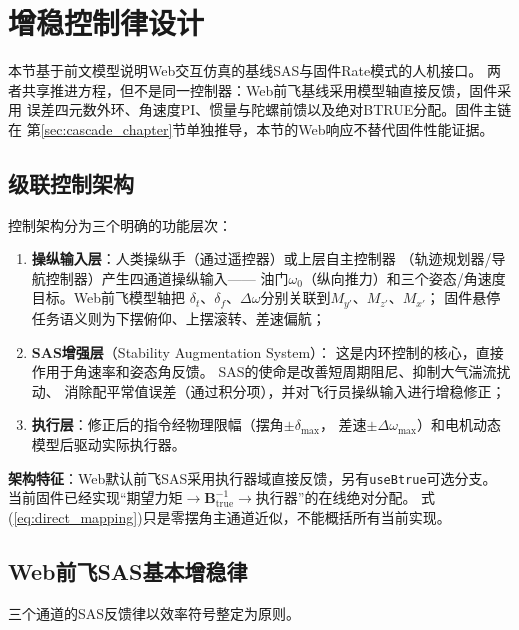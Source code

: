 \section{增稳控制律设计}
\label{sec:control}

本节基于前文模型说明Web交互仿真的基线SAS与固件Rate模式的人机接口。
两者共享推进方程，但不是同一控制器：Web前飞基线采用模型轴直接反馈，固件采用
误差四元数外环、角速度PI、惯量与陀螺前馈以及绝对BTRUE分配。固件主链在
第\ref{sec:cascade_chapter}节单独推导，本节的Web响应不替代固件性能证据。

\subsection{级联控制架构}

控制架构分为三个明确的功能层次：

\begin{enumerate}[label=(\arabic*)]
    \item \textbf{操纵输入层}：人类操纵手（通过遥控器）或上层自主控制器
          （轨迹规划器/导航控制器）产生四通道操纵输入——
          油门$\omega_0$（纵向推力）和三个姿态/角速度目标。Web前飞模型轴把
          $\delta_t$、$\delta_f$、$\Delta\omega$分别关联到$M_{y'}$、$M_{z'}$、$M_{x'}$；
          固件悬停任务语义则为下摆俯仰、上摆滚转、差速偏航；
    \item \textbf{SAS增强层}（Stability Augmentation System）：
          这是内环控制的核心，直接作用于角速率和姿态角反馈。
          SAS的使命是改善短周期阻尼、抑制大气湍流扰动、
          消除配平常值误差（通过积分项），并对飞行员操纵输入进行增稳修正；
    \item \textbf{执行层}：修正后的指令经物理限幅（摆角$\pm\delta_{\max}$，
          差速$\pm\Delta\omega_{\max}$）和电机动态模型后驱动实际执行器。
\end{enumerate}

\textbf{架构特征}：Web默认前飞SAS采用执行器域直接反馈，另有\texttt{useBtrue}可选分支。
当前固件已经实现“期望力矩$\to\bm B_{\mathrm{true}}^{-1}\to$执行器”的在线绝对分配。
式(\ref{eq:direct_mapping})只是零摆角主通道近似，不能概括所有当前实现。



\subsection{Web前飞SAS基本增稳律}

三个通道的SAS反馈律以效率符号整定为原则。

